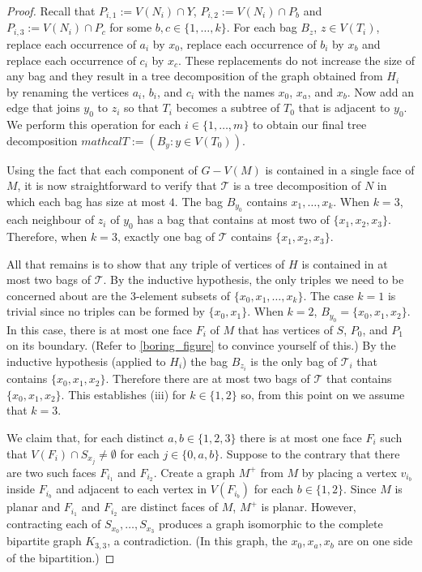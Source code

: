 \documentclass{patmorin}
\theoremstyle{plain}
\theoremstyle{definition}
\begin{document}
\begin{proof}
	Recall that $P_{i,1}:=V(N_i)\cap Y$, $P_{i,2}:=V(N_i)\cap P_b$ and $P_{i,3}:=V(N_i)\cap P_c$ for some $b,c\in\{1,\ldots,k\}$.  For each bag $B_z$, $z\in V(T_i)$, replace each occurrence of $a_i$ by $x_0$, replace each occurrence of $b_i$ by $x_b$ and replace each occurrence of $c_i$ by $x_c$.  These replacements do not increase the size of any bag and they result in a tree decomposition of the graph obtained from $H_i$ by renaming the vertices $a_i$, $b_i$, and $c_i$ with the names $x_0$, $x_a$, and $x_b$. Now add an edge that joins $y_0$ to $z_i$ so that $T_i$ becomes a subtree of $T_0$ that is adjacent to $y_0$.  We perform this operation for each $i\in\{1,\ldots,m\}$ to obtain our final tree decomposition $mathcal{T}:=(B_y:y\in V(T_0))$.

	Using the fact that each component of $G-V(M)$ is contained in a single face of $M$, it is now straightforward to verify that $\mathcal{T}$ is a tree decomposition of $N$ in which each bag has size at most $4$.  The bag $B_{y_0}$ contains $x_1,\ldots,x_k$. When $k=3$, each neighbour of $z_i$ of $y_0$ has a bag that contains at most two of $\{x_1,x_2,x_3\}$.  Therefore, when $k=3$, exactly one bag of $\mathcal{T}$ contains $\{x_1,x_2,x_3\}$.

	All that remains is to show that any triple of vertices of $H$ is contained in at most two bags of $\mathcal{T}$. By the inductive hypothesis, the only triples we need to be concerned about are the $3$-element subsets of  $\{x_0,x_1,\ldots,x_k\}$. The case $k=1$ is trivial since no triples can be formed by $\{x_0,x_1\}$.  When $k=2$, $B_{y_0}=\{x_0,x_1,x_2\}$.  In this case, there is at most one face $F_i$ of $M$ that has vertices of $S$, $P_0$, and $P_1$ on its boundary.  (Refer to \cref{boring_figure} to convince yourself of this.)  By the inductive hypothesis (applied to $H_i$) the bag $B_{z_i}$ is the only bag of $\mathcal{T}_i$ that contains $\{x_0,x_1,x_2\}$.  Therefore there are at most two bags of $\mathcal{T}$ that contains $\{x_0,x_1,x_2\}$.  This establishes (iii) for $k\in\{1,2\}$ so, from this point on we assume that $k=3$.

	We claim that, for each distinct $a,b\in \{1,2,3\}$ there is at most one face $F_i$ such that $V(F_i)\cap S_{x_j}\neq\emptyset$ for each $j\in\{0,a,b\}$.  Suppose to the contrary that there are two such faces $F_{i_1}$ and $F_{i_2}$.  Create a graph $M^+$ from $M$ by placing a vertex $v_{i_b}$ inside $F_{i_b}$ and adjacent to each vertex in $V(F_{i_b})$ for each $b\in\{1,2\}$.  Since $M$ is planar and $F_{i_1}$ and $F_{i_2}$ are distinct faces of $M$, $M^+$ is planar.  However, contracting each of $S_{x_0},\ldots,S_{x_3}$ produces a graph isomorphic to the complete bipartite graph $K_{3,3}$, a contradiction.  (In this graph, the $x_0,x_a,x_b$ are on one side of the bipartition.)


\end{proof}
\end{document}

